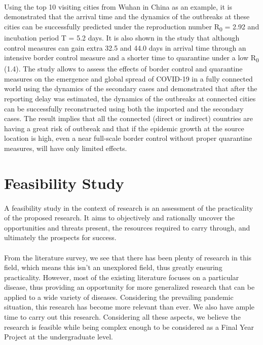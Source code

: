 \documentclass[14pt, a4paper]{extarticle}
\begin{document}
            \paragraph{} Using the top 10 visiting cities from Wuhan in China as an example, it is demonstrated that the arrival time and the dynamics of the outbreaks at these cities can be successfully predicted under the reproduction number R\textsubscript{0} = 2.92 and incubation period T = 5.2 days. It is also shown in the study that although control measures can gain extra 32.5 and 44.0 days in arrival time through an intensive border control measure and a shorter time to quarantine under a low R\textsubscript{0} (1.4). The study allows to assess the effects of border control and quarantine measures on the emergence and global spread of COVID-19 in a fully connected world using the dynamics of the secondary cases and demonstrated that after the reporting delay was estimated, the dynamics of the outbreaks at connected cities can be successfully reconstructed using both the imported and the secondary cases. The result implies that all the connected (direct or indirect) countries are having a great risk of outbreak and that if the epidemic growth at the source location is high, even a near full-scale border control without proper quarantine measures, will have only limited effects.
    
    \newpage
    \section{Feasibility Study}
        \paragraph{} A feasibility study in the context of research is an assessment of the practicality of the proposed research. It aims to objectively and rationally uncover the opportunities and threats present, the resources required to carry through, and ultimately the prospects for success.

        \paragraph{} From the literature survey, we see that there has been plenty of research in this field, which means this isn't an unexplored field, thus greatly ensuring practicality. However, most of the existing literature focuses on a particular disease, thus providing an opportunity for more generalized research that can be applied to a wide variety of diseases. Considering the prevailing pandemic situation, this research has become more relevant than ever. We also have ample time to carry out this research. Considering all these aspects, we believe the research is feasible while being complex enough to be considered as a Final Year Project at the undergraduate level.
    
\end{document}
